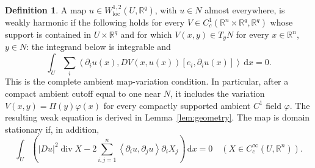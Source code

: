 \documentclass[11pt,a4paper]{article}
\numberwithin{equation}{section}
\theoremstyle{definition}
\newtheorem{definition}[theorem]{Definition}
\theoremstyle{remark}
\newcommand{\R}{\mathbb R}
\newcommand{\dd}{\,\mathrm d}
\newcommand{\dx}{\dd x}
\newcommand{\loc}{\mathrm{loc}}
\newcommand{\diver}{\operatorname{div}}
\newcommand{\pair}[2]{\left\langle#1,#2\right\rangle}
\begin{document}
\begin{definition}\label{def:weak}
A map $u\in W^{1,2}_{\loc}(U,\R^q)$, with $u\in N$ almost everywhere, is
weakly harmonic if the following holds for every
$V\in C_c^1(\R^n\times\R^q,\R^q)$ whose support is contained in
$U\times\R^q$ and for which $V(x,y)\in T_yN$ for every $x\in\R^n$,
$y\in N$: the integrand below is integrable and
\begin{equation}\label{eq:map-variation}
 \int_U\sum_i\pair{\partial_i u(x)}
 {DV(x,u(x))[e_i,\partial_i u(x)]}\dx=0.
\end{equation}
This is the complete ambient map-variation condition. In particular,
after a compact ambient cutoff equal to one near $N$, it includes the
variation $V(x,y)=\Pi(y)\varphi(x)$ for every compactly supported
ambient $C^1$ field $\varphi$. The resulting weak equation is derived
in Lemma~\ref{lem:geometry}. The map is domain stationary if, in addition,
\begin{equation}\label{eq:stress}
 \int_U\left(|Du|^2\diver X
 -2\sum_{i,j=1}^n\pair{\partial_i u}{\partial_j u}\partial_iX_j\right)\dx=0
 \quad(X\in C_c^\infty(U,\R^n)).
\end{equation}
\end{definition}
\end{document}
